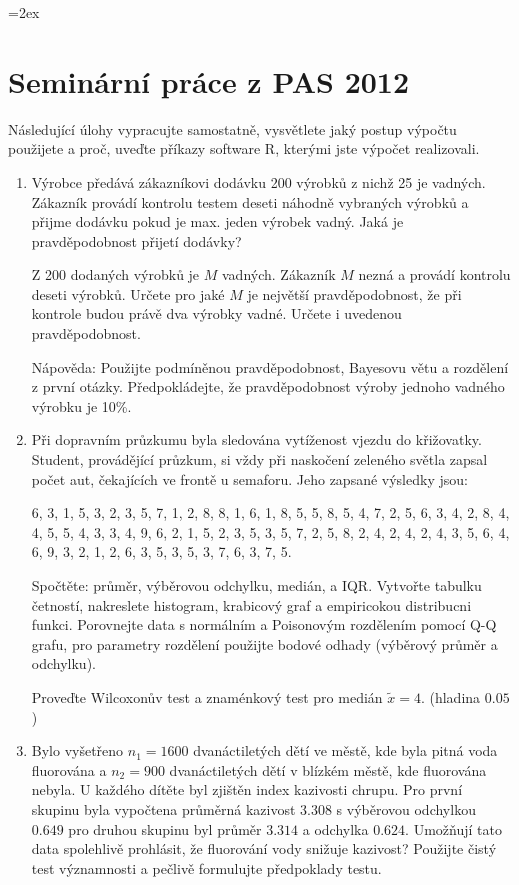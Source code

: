 \documentclass[a4paper,12pt]{article}
\begin{document}
\parskip=2ex
\parindent=0pt
\pagestyle{empty}
 \section*{Seminární práce z PAS 2012}

 Následující úlohy vypracujte samostatně, vysvětlete jaký postup výpočtu použijete a proč, uveďte příkazy software R, kterými jste výpočet realizovali.


 \begin{enumerate}
  \item Výrobce předává zákazníkovi dodávku 200 výrobků z nichž 25 je vadných. 
  Zákazník provádí kontrolu testem deseti náhodně vybraných výrobků a přijme dodávku pokud je max. jeden výrobek vadný. 
  Jaká je pravděpodobnost přijetí dodávky? 

  Z 200 dodaných výrobků je $M$ vadných. Zákazník $M$ nezná a provádí kontrolu deseti výrobků. Určete pro jaké $M$
  je největší pravděpodobnost, že při kontrole budou právě dva výrobky vadné. Určete i uvedenou pravděpodobnost.

  Nápověda: Použijte podmíněnou pravděpodobnost, Bayesovu větu a rozdělení z první otázky. Předpokládejte, že pravděpodobnost výroby jednoho vadného výrobku je 10\%.

  \item Při dopravním průzkumu byla sledována vytíženost vjezdu do křižovatky.
  Student, provádějící průzkum, si vždy při naskočení zeleného světla zapsal počet aut, čekajících 
  ve frontě u semaforu. Jeho zapsané výsledky jsou:

  6, 3, 1, 5, 3, 2, 3, 5, 7, 1, 2, 8, 8, 1, 6, 1, 8, 5, 5, 8, 5, 4, 7, 2, 5, 6, 3, 4, 2, 8, 4, 4, 5, 5, 4,
3, 3, 4, 9, 6, 2, 1, 5, 2, 3, 5, 3, 5, 7, 2, 5, 8, 2, 4, 2, 4, 2, 4, 3, 5, 6, 4, 6, 9, 3, 2, 1, 2, 6, 3,
5, 3, 5, 3, 7, 6, 3, 7, 5.

  Spočtěte: průměr, výběrovou odchylku, medián, a IQR. Vytvořte tabulku četností, nakreslete histogram, krabicový graf a empiricokou distribucni funkci. 
  Porovnejte data s normálním a Poisonovým rozdělením pomocí Q-Q grafu, 
  pro parametry rozdělení použijte bodové odhady (výběrový průměr a odchylku). 
  
  Proveďte Wilcoxonův test a znaménkový test pro medián $\tilde{x}=4$. (hladina $0.05$)

  \item Bylo vyšetřeno $n_1 = 1600$ dvanáctiletých dětí ve městě, kde byla pitná voda fluorována
 a $n_2 = 900$ dvanáctiletých dětí v blízkém městě, kde fluorována nebyla.
U každého dítěte byl zjištěn index kazivosti chrupu. 
Pro první skupinu byla vypočtena průměrná kazivost $3.308$ s výběrovou odchylkou $0.649$ pro 
druhou skupinu byl průměr $3.314$ a odchylka $0.624$. Umožňují tato data spolehlivě prohlásit, že 
fluorování vody snižuje kazivost? Použijte čistý test významnosti a pečlivě formulujte předpoklady testu.


\end{enumerate}
\end{document}
